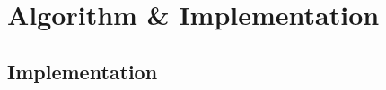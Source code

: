 \documentclass[twocolumn]{article}
\begin{document}
\section{Algorithm \& Implementation}

\subsection{Implementation}
\end{document}

